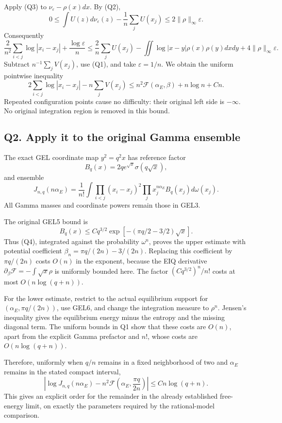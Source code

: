 \documentclass[
  11pt,
]{article}
\begin{document}
Apply (Q3) to \(\nu_\varepsilon-\rho(x)dx\). By (Q2), \[
0\le\int U(z)d\nu_\varepsilon(z)-\frac1n\sum_jU(x_j)
\le2\|\rho\|_\infty\varepsilon.
\] Consequently \[
\frac2{n^2}\sum_{i<j}\log|x_i-x_j|+\frac{\log\varepsilon}{n}
\le\frac2n\sum_jU(x_j)-\iint\log|x-y|\rho(x)\rho(y)dxdy
+4\|\rho\|_\infty\varepsilon.
\] Subtract \(n^{-1}\sum_jV(x_j)\), use (Q1), and take
\(\varepsilon=1/n\). We obtain the uniform pointwise inequality \[
\boxed{2\sum_{i<j}\log|x_i-x_j|-n\sum_jV(x_j)
\le n^2\mathcal F(\alpha_E,\beta)+n\log n+C n.}
\tag{Q4}
\] Repeated configuration points cause no difficulty: their original
left side is \(-\infty\). No original integration region is removed in
this bound.

\subsection{Q2. Apply it to the original Gamma
ensemble}\label{q2.-apply-it-to-the-original-gamma-ensemble}

The exact GEL coordinate map \(y^2=q^2x\) has reference factor \[
B_q(x)=2q e^{\sqrt x}\sigma(q\sqrt x),
\] and ensemble \[
J_{n,q}(n\alpha_E)=\frac1{n!}\int\prod_{i<j}(x_i-x_j)^2
\prod_jx_j^{n\alpha_E}B_q(x_j)d\omega(x_j).
\tag{Q5}
\] All Gamma masses and coordinate powers remain those in GEL3.

The original GEL5 bound is \[
B_q(x)\le Cq^{3/2}\exp[-(\pi q/2-3/2)\sqrt x].
\] Thus (Q4), integrated against the probability \(\omega^n\), proves
the upper estimate with potential coefficient
\(\beta_n=\pi q/(2n)-3/(2n)\). Replacing this coefficient by
\(\pi q/(2n)\) costs \(O(n)\) in the exponent, because the EIQ
derivative \(\partial_\beta\mathcal F=-\int\sqrt x\rho\) is uniformly
bounded here. The factor \((Cq^{3/2})^n/n!\) costs at most
\(O(n\log(q+n))\).

For the lower estimate, restrict to the actual equilibrium support for
\((\alpha_E,\pi q/(2n))\), use GEL6, and change the integration measure
to \(\rho^n\). Jensen's inequality gives the equilibrium energy minus
the entropy and the missing diagonal term. The uniform bounds in Q1 show
that these costs are \(O(n)\), apart from the explicit Gamma prefactor
and \(n!\), whose costs are \(O(n\log(q+n))\).

Therefore, uniformly when \(q/n\) remains in a fixed neighborhood of two
and \(\alpha_E\) remains in the stated compact interval, \[
\boxed{\left|\log J_{n,q}(n\alpha_E)
-n^2\mathcal F\!\left(\alpha_E,\frac{\pi q}{2n}\right)\right|
\le C n\log(q+n).}
\tag{Q6}
\] This gives an explicit order for the remainder in the already
established free-energy limit, on exactly the parameters required by the
rational-model comparison.
\end{document}
